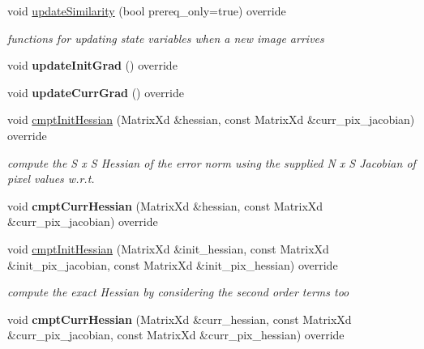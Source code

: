 \begin{DoxyCompactItemize}
\item 
void \hyperlink{classMI_a9d4a0ea761a2576fff6db5e33e41510b}{update\-Similarity} (bool prereq\-\_\-only=true) override
\begin{DoxyCompactList}\small\item\em functions for updating state variables when a new image arrives \end{DoxyCompactList}\item 
\hypertarget{classMI_a68c31eb202772e09315bb9157d5a3df6}{void {\bfseries update\-Init\-Grad} () override}\label{classMI_a68c31eb202772e09315bb9157d5a3df6}

\item 
\hypertarget{classMI_a93308f9f8a66863a323536cfa57a401f}{void {\bfseries update\-Curr\-Grad} () override}\label{classMI_a93308f9f8a66863a323536cfa57a401f}

\item 
void \hyperlink{classMI_ac8c6ba16d8f99be968857217723ddce8}{cmpt\-Init\-Hessian} (Matrix\-Xd \&hessian, const Matrix\-Xd \&curr\-\_\-pix\-\_\-jacobian) override
\begin{DoxyCompactList}\small\item\em compute the S x S Hessian of the error norm using the supplied N x S Jacobian of pixel values w.\-r.\-t. \end{DoxyCompactList}\item 
\hypertarget{classMI_ada081c0a81f879f0741ed2ddc5ef6161}{void {\bfseries cmpt\-Curr\-Hessian} (Matrix\-Xd \&hessian, const Matrix\-Xd \&curr\-\_\-pix\-\_\-jacobian) override}\label{classMI_ada081c0a81f879f0741ed2ddc5ef6161}

\item 
\hypertarget{classMI_acf6d80b74b1ec257c5b0206d3a09105b}{void \hyperlink{classMI_acf6d80b74b1ec257c5b0206d3a09105b}{cmpt\-Init\-Hessian} (Matrix\-Xd \&init\-\_\-hessian, const Matrix\-Xd \&init\-\_\-pix\-\_\-jacobian, const Matrix\-Xd \&init\-\_\-pix\-\_\-hessian) override}\label{classMI_acf6d80b74b1ec257c5b0206d3a09105b}

\begin{DoxyCompactList}\small\item\em compute the exact Hessian by considering the second order terms too \end{DoxyCompactList}\item 
\hypertarget{classMI_a66d5be339f92c1f0b164a3fb78947e49}{void {\bfseries cmpt\-Curr\-Hessian} (Matrix\-Xd \&curr\-\_\-hessian, const Matrix\-Xd \&curr\-\_\-pix\-\_\-jacobian, const Matrix\-Xd \&curr\-\_\-pix\-\_\-hessian) override}\label{classMI_a66d5be339f92c1f0b164a3fb78947e49}


\end{DoxyCompactItemize}
